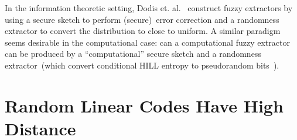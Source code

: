 \documentclass[11pt]{article}
\newcommand{\secref}[1]{\mbox{Section~\ref{#1}}}
\newcommand{\defref}[1]{\mbox{Definition~\ref{#1}}}
\newcommand{\hill}{\ensuremath{\mathtt{HILL}}\xspace}
\newcommand{\yao}{\ensuremath{\mathtt{Yao}}\xspace}
\newcommand{\unp}{\ensuremath{\mathtt{unp}}\xspace}
\newtheorem{lemma}[theorem]{Lemma}
\newtheorem{definition}[theorem]{Definition}
\begin{document}
{In the information theoretic setting, Dodis et. al.~\cite{DBLP:journals/siamcomp/DodisORS08} construct fuzzy extractors by using a secure sketch to perform (secure)~error correction and a randomness extractor to convert the distribution to close to uniform.  A similar paradigm seems desirable in the computational case: can a computational fuzzy extractor can be produced by a ``computational'' secure sketch and a randomness extractor~(which convert conditional HILL entropy to pseudorandom bits~\cite[Lemma 5]{DBLP:conf/eurocrypt/HsiaoLR07}).
}


\appendix
\section{Random Linear Codes Have High Distance}
\end{document}
